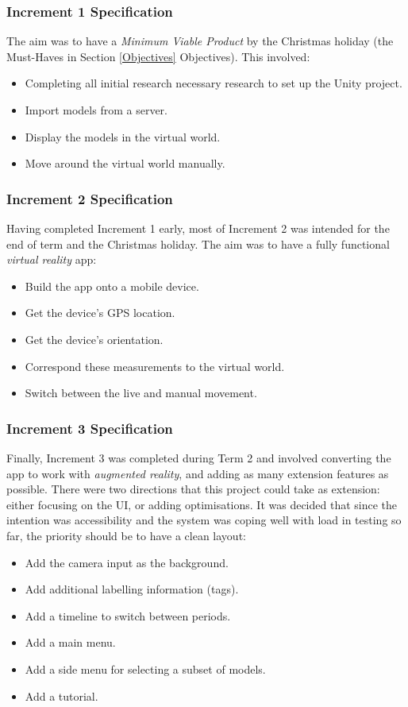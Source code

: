 \documentclass[12pt, a4paper]{article}
\begin{document}
\subsubsection{Increment 1 Specification}
The aim was to have a \textit{Minimum Viable Product} by the Christmas holiday (the Must-Haves in Section \ref{Objectives} Objectives). This involved:

\begin{itemize}
    \item Completing all initial research necessary research to set up the Unity project.
    \item Import models from a server.
    \item Display the models in the virtual world.
    \item Move around the virtual world manually. 
\end{itemize} 

\subsubsection{Increment 2 Specification}
Having completed Increment 1 early, most of Increment 2 was intended for the end of term and the Christmas holiday. The aim was to have a fully functional \textit{virtual reality} app: 
\begin{itemize}
    \item Build the app onto a mobile device.
    \item Get the device's GPS location.
    \item Get the device's orientation. 
    \item Correspond these measurements to the virtual world.
    \item Switch between the live and manual movement.
\end{itemize} 

\subsubsection{Increment 3 Specification}
\label{increment3}
Finally, Increment 3 was completed during Term 2 and involved converting the app to work with \textit{augmented reality}, and adding as many extension features as possible. There were two directions that this project could take as extension: either focusing on the UI, or adding optimisations. It was decided that since the intention was accessibility and the system was coping well with load in testing so far, the priority should be to have a clean layout:
\begin{itemize}
    \item Add the camera input as the background.
    \item Add additional labelling information (tags).
    \item Add a timeline to switch between periods. 
    \item Add a main menu.
    \item Add a side menu for selecting a subset of models.
    \item Add a tutorial.
\end{itemize} 
\end{document}
